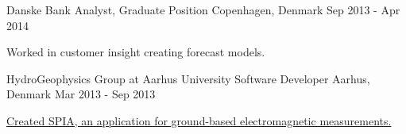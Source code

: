 \begin{cventries}
  \cventry
  {Danske Bank} %
  {Analyst, Graduate Position} %
    {Copenhagen, Denmark} %
    {Sep 2013 - Apr 2014} %
    {
      \begin{cvitems} %
        \item {Worked in customer insight creating forecast models.}
      \end{cvitems}
    }

  \cventry
  {HydroGeophysics Group at Aarhus University} %
  {Software Developer} %
    {Aarhus, Denmark} %
    {Mar 2013 - Sep 2013} %
    {
      \begin{cvitems} %
        \item {\href{https://hgg.au.dk/software/spia}{Created SPIA, an application for ground-based electromagnetic measurements.}}
      \end{cvitems}
    }


\end{cventries}
